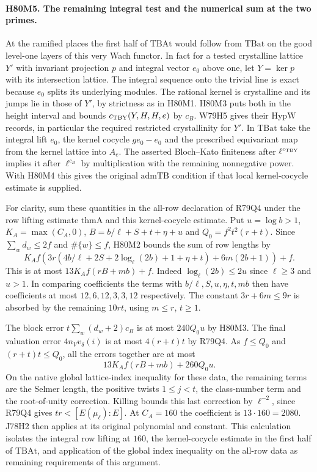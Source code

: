 \paragraph{H80M5. The remaining integral test and the numerical sum at the two primes.}
At the ramified places the first half of $\mathrm{TBAt}$ would follow
from $\mathrm{TBat}$ on the good level-one layers of this very Wach
functor. In fact for a tested crystalline lattice $Y'$ with
invariant projection $p$ and integral vector $e_0$ above one,
let $Y=\ker p$ with its intersection lattice. The integral sequence
onto the trivial line is exact because $e_0$ splits its underlying
modules. The rational kernel is crystalline and its jumps lie in
those of $Y'$, by strictness as in H80M1. H80M3 puts both in the
height interval and bounds $c_{\rm TBY}(Y,H,H,e)$ by $c_B$.
W79H5 gives their $\mathrm{HypW}$ records, in particular the
required restricted crystallinity for $Y'$. In $\mathrm{TBat}$
take the integral lift $e_0$, the kernel cocycle $g e_0-e_0$ and
the prescribed equivariant map from the kernel lattice into $A_e$.
The asserted Bloch--Kato finiteness after
$\ell^{c_{\rm TBY}}$ implies it after $\ell^{c_B}$ by multiplication
with the remaining nonnegative power. With H80M4 this gives the
original $\mathrm{admTB}$ condition if that local kernel-cocycle
estimate is supplied.

For clarity, sum these quantities in the all-row declaration of
R79Q4 under the row lifting estimate $\mathrm{thmA}$ and this
kernel-cocycle estimate. Put $u=\log b>1$, $K_A=\max(C_A,0)$,
$B=b/\ell+S+t+\eta+u$ and $Q_0=f^2t^2(r+t)$.
Since $\sum_w d_w\le2f$ and $\#\{w\}\le f$, H80M2 bounds the
sum of row lengths by
\[
 K_A f\!\left(3r(4b/\ell+2S+2\log_\ell(2b)+1+\eta+t)
                      +6m(2b+1)\right)+f .
\]
This is at most $13K_A f(rB+mb)+f$. Indeed
$\log_\ell(2b)\le2u$ since $\ell\ge3$ and $u>1$.
In comparing coefficients the terms with $b/\ell,S,u,\eta,t,mb$
then have coefficients at most $12,6,12,3,3,12$ respectively.
The constant $3r+6m\le9r$ is absorbed by the remaining
$10rt$, using $m\le r$, $t\ge1$.

The block error $t\sum_w(d_w+2)c_B$ is at most $240Q_0u$
by H80M3. The final valuation error $4n_Vv_\delta(i)$ is at most
$4(r+t)t$ by R79Q4. As $f\le Q_0$ and $(r+t)t\le Q_0$, all
the errors together are at most
\[
             13K_A f(rB+mb)+260Q_0u .
\]
On the native global lattice-index inequality for these data, the
remaining terms are the Selmer length, the positive twists
$1\le j<t$, the class-number term and the root-of-unity correction.
Killing bounds this last correction by $\ell^{-2}$, since R79Q4
gives $tr<[E(\mu_\ell):E]$. At $C_A=160$ the coefficient is
$13\cdot160=2080$. J78H2 then applies at its original polynomial
and constant. This calculation isolates the integral row lifting
at $160$, the kernel-cocycle estimate in the first half of
$\mathrm{TBAt}$, and application of the global index inequality on
the all-row data as remaining requirements of this argument.
